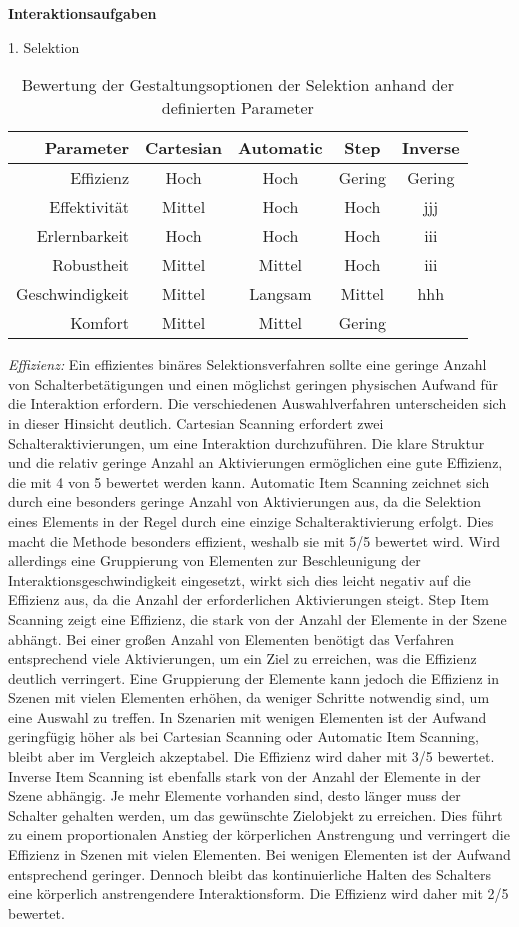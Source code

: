 {\normalfont \bfseries Interaktionsaufgaben}  

1. Selektion

\begin{table}[ht]
 \centering
 \begin{tabular}{r|c|c|c|c}
 Parameter & Cartesian & Automatic & Step & Inverse\\
 \hline
 Effizienz & Hoch & Hoch & Gering & Gering\\
 Effektivität & Mittel & Hoch & Hoch & jjj\\
 Erlernbarkeit & Hoch & Hoch & Hoch & iii\\
 Robustheit & Mittel & Mittel & Hoch & iii\\
 Geschwindigkeit & Mittel & Langsam & Mittel & hhh\\
 Komfort & Mittel & Mittel & Gering \\
 \end{tabular}
 \caption{Bewertung der Gestaltungsoptionen der Selektion anhand der definierten Parameter}
 \label{tab:Selektion}
\end{table}

\textit{Effizienz:}
Ein effizientes binäres Selektionsverfahren sollte eine geringe Anzahl von Schalterbetätigungen und einen möglichst geringen physischen Aufwand für die Interaktion erfordern. Die verschiedenen Auswahlverfahren unterscheiden sich in dieser Hinsicht deutlich. Cartesian Scanning erfordert zwei Schalteraktivierungen, um eine Interaktion durchzuführen. Die klare Struktur und die relativ geringe Anzahl an Aktivierungen ermöglichen eine gute Effizienz, die mit 4 von 5 bewertet werden kann. Automatic Item Scanning zeichnet sich durch eine besonders geringe Anzahl von Aktivierungen aus, da die Selektion eines Elements in der Regel durch eine einzige Schalteraktivierung erfolgt. Dies macht die Methode besonders effizient, weshalb sie mit 5/5 bewertet wird. Wird allerdings eine Gruppierung von Elementen zur Beschleunigung der Interaktionsgeschwindigkeit eingesetzt, wirkt sich dies leicht negativ auf die Effizienz aus, da die Anzahl der erforderlichen Aktivierungen steigt. Step Item Scanning zeigt eine Effizienz, die stark von der Anzahl der Elemente in der Szene abhängt. Bei einer großen Anzahl von Elementen benötigt das Verfahren entsprechend viele Aktivierungen, um ein Ziel zu erreichen, was die Effizienz deutlich verringert. Eine Gruppierung der Elemente kann jedoch die Effizienz in Szenen mit vielen Elementen erhöhen, da weniger Schritte notwendig sind, um eine Auswahl zu treffen. In Szenarien mit wenigen Elementen ist der Aufwand geringfügig höher als bei Cartesian Scanning oder Automatic Item Scanning, bleibt aber im Vergleich akzeptabel. Die Effizienz wird daher mit 3/5 bewertet. Inverse Item Scanning ist ebenfalls stark von der Anzahl der Elemente in der Szene abhängig. Je mehr Elemente vorhanden sind, desto länger muss der Schalter gehalten werden, um das gewünschte Zielobjekt zu erreichen. Dies führt zu einem proportionalen Anstieg der körperlichen Anstrengung und verringert die Effizienz in Szenen mit vielen Elementen. Bei wenigen Elementen ist der Aufwand entsprechend geringer. Dennoch bleibt das kontinuierliche Halten des Schalters eine körperlich anstrengendere Interaktionsform. Die Effizienz wird daher mit 2/5 bewertet. 

